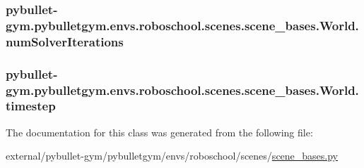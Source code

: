 \subsubsection[{\texorpdfstring{num\+Solver\+Iterations}{numSolverIterations}}]{\setlength{\rightskip}{0pt plus 5cm}pybullet-\/gym.\+pybulletgym.\+envs.\+roboschool.\+scenes.\+scene\+\_\+bases.\+World.\+num\+Solver\+Iterations}\hypertarget{classpybullet-gym_1_1pybulletgym_1_1envs_1_1roboschool_1_1scenes_1_1scene__bases_1_1_world_ab373b544cc3abe20d5454b2f597fff4a}{}\label{classpybullet-gym_1_1pybulletgym_1_1envs_1_1roboschool_1_1scenes_1_1scene__bases_1_1_world_ab373b544cc3abe20d5454b2f597fff4a}
\subsubsection[{\texorpdfstring{timestep}{timestep}}]{\setlength{\rightskip}{0pt plus 5cm}pybullet-\/gym.\+pybulletgym.\+envs.\+roboschool.\+scenes.\+scene\+\_\+bases.\+World.\+timestep}\hypertarget{classpybullet-gym_1_1pybulletgym_1_1envs_1_1roboschool_1_1scenes_1_1scene__bases_1_1_world_a1bafc4a95fd93937b04a5b88acfc4759}{}\label{classpybullet-gym_1_1pybulletgym_1_1envs_1_1roboschool_1_1scenes_1_1scene__bases_1_1_world_a1bafc4a95fd93937b04a5b88acfc4759}


The documentation for this class was generated from the following file\+:\begin{DoxyCompactItemize}
\item 
external/pybullet-\/gym/pybulletgym/envs/roboschool/scenes/\hyperlink{roboschool_2scenes_2scene__bases_8py}{scene\+\_\+bases.\+py}\end{DoxyCompactItemize}
